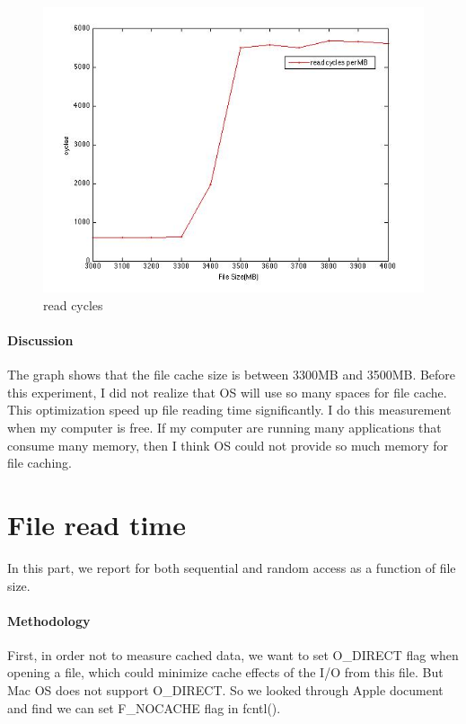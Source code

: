 \begin{figure}[htbp] %
   \centering
   \includegraphics[width=5in]{./pics/41.jpg} 
   \caption{read cycles}
   \label{fig:read cycles}
\end{figure}

\paragraph{Discussion}
The graph shows that the file cache size is between 3300MB and 3500MB. Before this experiment, I did not realize that OS will use so many spaces for file cache. This optimization speed up file reading time significantly. I do this measurement when my computer is free. If my computer are running many applications that consume many memory, then I think OS could not provide so much memory for file caching.

\section{File read time}
In this part, we report for both sequential and random access as a function of file size.

\paragraph{Methodology}
First, in order not to measure cached data, we want to set O\_DIRECT flag when opening a file, which could minimize cache effects of the I/O from this file. But Mac OS does not support O\_DIRECT. So we looked through Apple document and find we can set F\_NOCACHE flag in fcntl().


